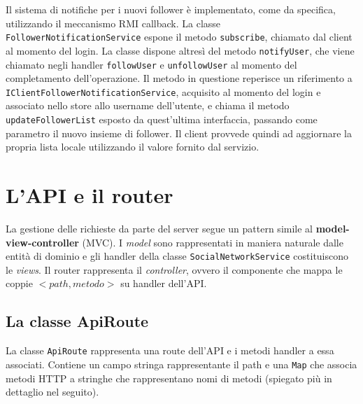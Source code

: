 \documentclass[a4paper,8pt]{article} %
\def\code#1{\texttt{#1}}
\begin{document}
\par Il sistema di notifiche per i nuovi follower è implementato, come da specifica, utilizzando il meccanismo RMI callback. La classe \code{FollowerNotificationService} espone il metodo \code{subscribe}, chiamato dal client al momento del login.
La classe dispone altresì del metodo \code{notifyUser}, che viene chiamato negli handler \code{followUser} e \code{unfollowUser} al momento del completamento dell'operazione. Il metodo in questione reperisce un riferimento a \code{IClientFollowerNotificationService},
acquisito al momento del login e associato nello store allo username dell'utente, e chiama il metodo \code{updateFollowerList} esposto da quest'ultima interfaccia, passando come parametro il nuovo insieme di follower.
Il client provvede quindi ad aggiornare la propria lista locale utilizzando il valore fornito dal servizio.



\section{L'API e il router}
La gestione delle richieste da parte del server segue un pattern simile al \textbf{model-view-controller} (MVC).
I \emph{model} sono rappresentati in maniera naturale dalle entità di dominio e gli handler della classe \code{SocialNetworkService} costituiscono
le \emph{views}. Il router rappresenta il \emph{controller}, ovvero il componente che mappa le coppie $<path, metodo>$ su handler dell'API.

\subsection{La classe ApiRoute}
La classe \code{ApiRoute} rappresenta una route dell'API e i metodi handler a essa associati. Contiene un campo stringa rappresentante il path e una \code{Map}
che associa metodi HTTP a stringhe che rappresentano nomi di metodi (spiegato più in dettaglio nel seguito).
\end{document}
